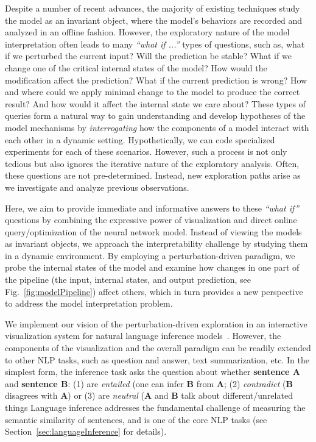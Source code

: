 Despite a number of recent advances, the majority of existing techniques study the model as an invariant object, where the model's behaviors are recorded and analyzed in an offline fashion.
%
However, the exploratory nature of the model interpretation often leads to many \emph{``what if ...''} types of questions, 
such as, what if we perturbed the current input?
Will the prediction be stable?
What if we change one of the critical internal states of the model? 
How would the modification affect the prediction? 
What if the current prediction is wrong? 
How and where could we apply minimal change to the model to produce the correct result? And how would it affect the internal state we care about? These types of queries form a natural way to gain understanding and develop hypotheses of the model mechanisms by \emph{interrogating} how the components of a model interact with each other in a dynamic setting.
Hypothetically, we can code specialized experiments for each of these scenarios.
However, such a process is not only tedious but also ignores the iterative nature of the exploratory analysis. Often, these questions are not pre-determined.
Instead, new exploration paths arise as we investigate and analyze previous observations.

Here, we aim to provide immediate and informative answers to these \emph{``what if''} questions by combining the expressive power of visualization and direct online query/optimization of the neural network model. Instead of viewing the models as invariant objects, we approach the interpretability challenge by studying them in a dynamic environment. By employing a perturbation-driven paradigm, we probe the internal states of the model and examine how changes in one part of the pipeline (the input, internal states, and output prediction, see Fig.~\ref{fig:modelPipeline}) affect others, which in turn provides a new perspective to address the model interpretation problem.

We implement our vision of the perturbation-driven exploration in an interactive visualization system for natural language inference models~\cite{Parikh2016}.
However, the components of the visualization and the overall paradigm can be readily extended to other NLP tasks, such as question and answer, text summarization, etc.
%
In the simplest form, the inference task asks the question about whether \textbf{sentence A} and \textbf{sentence B}: (1) are \emph{entailed} (one can infer \textbf{B} from \textbf{A}; (2) \emph{contradict} (\textbf{B} disagrees with \textbf{A}) or (3) are \emph{neutral} (\textbf{A} and \textbf{B} talk about different/unrelated things
Language inference addresses the fundamental challenge of measuring the semantic similarity of sentences, and is one of the core NLP tasks (see Section~\ref{sec:languageInference} for details).


